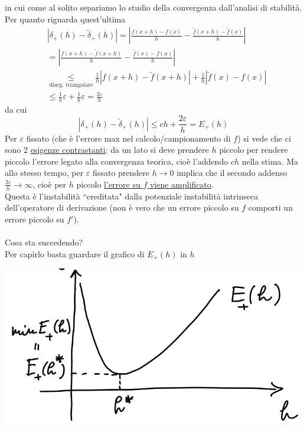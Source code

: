\documentclass[12pt,a4paper]{article}
\begin{document}
in cui come al solito separiamo lo studio della convergenza dall'analisi di stabilità.\\
Per quanto riguarda quest'ultima
\begin{equation*}
    \begin{split}
        & |\delta_+(h)-\tilde{\delta}_+(h)| = | \frac{f(x+h) - f(x)}{h} - \frac{\tilde{f}(x+h) - \tilde{f}(x)}{h}| \\
        & = | \frac{f(x+h) - \tilde{f}(x+h)}{h} - \frac{\tilde{f}(x) - f(x)}{h}| \\
        & \underset{\text{diseg. triangolare}}{\leq} \frac{1}{h}|f(x+h) - \tilde{f}(x+h)| + \frac{1}{h}|\tilde{f}(x) - f(x)| \\
        & \leq \frac{1}{h}\varepsilon + \frac{1}{h}\varepsilon = \frac{2\varepsilon}{h}
    \end{split}
\end{equation*}
da cui 
\begin{equation*}
    |\delta_+(h)-\tilde{\delta}_+(h)| \leq ch+\frac{2\varepsilon}{h} = E_+(h)
\end{equation*}
Per $\varepsilon$ fissato (che è l'errore max nel calcolo/campionamento di $f$) si vede che ci sono 2 \uline{esigenze
contrastanti}: da un lato si deve prendere $h$ piccolo per rendere piccolo l'errore legato alla convergenza teorica, cioè l'addendo $ch$ nella stima. Ma allo stesso tempo, per $\varepsilon$ fissato prendere $h \rightarrow 0$ implica che il secondo addenso $\frac{2\varepsilon}{h}\rightarrow \infty$, cioè per $h$ piccolo \uline{l'errore su $f$ viene amplificato}.\\
Questa è l'instabilità ``ereditata" dalla potenziale instabilità intrinseca dell'operatore di derivazione (non è vero che
un errore piccolo su $f$ comporti un errore piccolo su $f'$).\\
\vspace{0.1cm}
\\
Cosa sta succedendo? \\
Per capirlo basta guardare il grafico di $E_+(h)$ in $h$
\begin{center}
    \includegraphics[scale=0.5]{pag15.png}    
\end{center}
\end{document}
